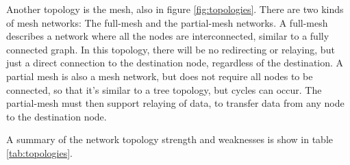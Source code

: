 Another topology is the mesh, also in figure \ref{fig:topologies}. There are two kinds of mesh networks: The full-mesh and the partial-mesh networks. A full-mesh describes a network where all the nodes are interconnected, similar to a fully connected graph. In this topology, there will be no redirecting or relaying, but just a direct connection to the destination node, regardless of the destination. A partial mesh is also a mesh network, but does not require all nodes to be connected, so that it's similar to a tree topology, but cycles can occur. The partial-mesh must then support relaying of data, to transfer data from any node to the destination node.

A summary of the network topology strength and weaknesses is show in table \ref{tab:topologies}.
\begin{figure}
\end{figure}
